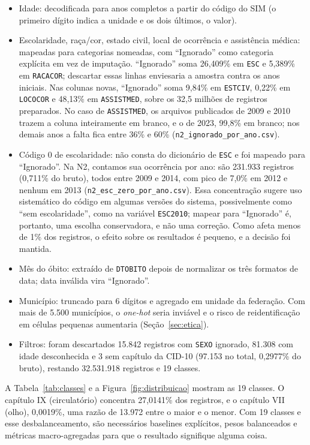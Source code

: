 \documentclass[12pt]{article}
\begin{document}
\begin{itemize}
  \item Idade: decodificada para anos completos a partir do código do SIM (o primeiro dígito indica a unidade e os dois últimos, o valor).
  \item Escolaridade, raça/cor, estado civil, local de ocorrência e assistência médica: mapeadas para categorias nomeadas, com ``Ignorado'' como categoria explícita em vez de imputação. ``Ignorado'' soma 26,409\% em \texttt{ESC} e 5,389\% em \texttt{RACACOR}; descartar essas linhas enviesaria a amostra contra os anos iniciais. Nas colunas novas, ``Ignorado'' soma 9,84\% em \texttt{ESTCIV}, 0,22\% em \texttt{LOCOCOR} e 48,13\% em \texttt{ASSISTMED}, sobre os 32,5 milhões de registros preparados. No caso de \texttt{ASSISTMED}, os arquivos publicados de 2009 e 2010 trazem a coluna inteiramente em branco, e o de 2023, 99,8\% em branco; nos demais anos a falta fica entre 36\% e 60\% (\texttt{n2\_ignorado\_por\_ano.csv}).
  \item Código 0 de escolaridade: não consta do dicionário de \texttt{ESC} e foi mapeado para ``Ignorado''. Na N2, contamos sua ocorrência por ano: são 231.933 registros (0,711\% do bruto), todos entre 2009 e 2014, com pico de 7,0\% em 2012 e nenhum em 2013 (\texttt{n2\_esc\_zero\_por\_ano.csv}). Essa concentração sugere uso sistemático do código em algumas versões do sistema, possivelmente como ``sem escolaridade'', como na variável \texttt{ESC2010}; mapear para ``Ignorado'' é, portanto, uma escolha conservadora, e não uma correção. Como afeta menos de 1\% dos registros, o efeito sobre os resultados é pequeno, e a decisão foi mantida.
  \item Mês do óbito: extraído de \texttt{DTOBITO} depois de normalizar os três formatos de data; data inválida vira ``Ignorado''.
  \item Município: truncado para 6 dígitos e agregado em unidade da federação. Com mais de 5.500 municípios, o \emph{one-hot} seria inviável e o risco de reidentificação em células pequenas aumentaria (Seção~\ref{sec:etica}).
  \item Filtros: foram descartados 15.842 registros com \texttt{SEXO} ignorado, 81.308 com idade desconhecida e 3 sem capítulo da CID-10 (97.153 no total, 0,2977\% do bruto), restando 32.531.918 registros e 19 classes.
\end{itemize}

A Tabela~\ref{tab:classes} e a Figura~\ref{fig:distribuicao} mostram as 19 classes. O capítulo IX (circulatório) concentra 27,0141\% dos registros, e o capítulo VII (olho), 0,0019\%, uma razão de 13.972 entre o maior e o menor. Com 19 classes e esse desbalanceamento, são necessários baselines explícitos, pesos balanceados e métricas macro-agregadas para que o resultado signifique alguma coisa.
\end{document}
